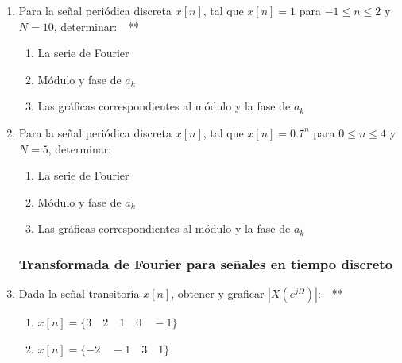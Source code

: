 \documentclass[10pt,a4paper]{article}
\begin{document}
\begin{enumerate}
\item {Para la señal periódica discreta $x[n]$, tal que $x[n]=1$ para $-1 \leq n \leq 2$ y $N=10$, determinar:}~~**
\begin{enumerate}
	\item La serie de Fourier		
	\item Módulo y fase de $a_k$
	\item Las gráficas correspondientes al módulo y la fase de $a_k$
\end{enumerate}	

\item {Para la señal periódica discreta $x[n]$, tal que $x[n]=0.7^n$ para $0 \leq n \leq 4$ y $N=5$, determinar:}
\begin{enumerate}
	\item La serie de Fourier		
	\item Módulo y fase de $a_k$
	\item Las gráficas correspondientes al módulo y la fase de $a_k$
\end{enumerate}

\subsubsection*{Transformada de Fourier para señales en tiempo discreto}
\item {Dada la señal transitoria $x[n]$, obtener y graficar $|X(e^{j\Omega})|$:}~~**
\begin{enumerate}
	\item $x[n]=\{3\quad 2\quad 1\quad 0\quad -1\}$
	\item $x[n]=\{-2\quad -1\quad 3\quad 1\}$
\end{enumerate}	

\end{enumerate}

\end{document}
